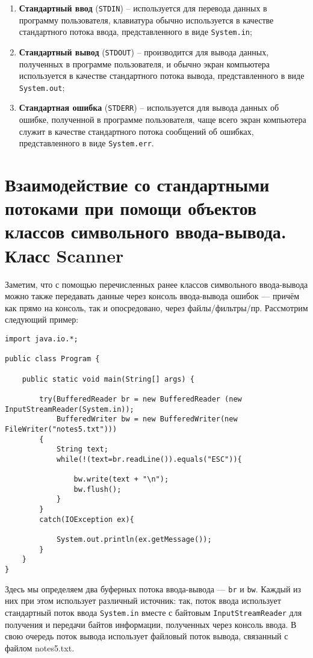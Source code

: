\begin{enumerate}
    \item \textbf{Стандартный ввод} (\verb|STDIN|) – используется для перевода данных в программу пользователя, клавиатура обычно используется в качестве стандартного потока ввода, представленного в виде \verb|System.in|;
    \item \textbf{Стандартный вывод} (\verb|STDOUT|) – производится для вывода данных, полученных в программе пользователя, и обычно экран компьютера используется в качестве стандартного потока вывода, представленного в виде \verb|System.out|;
    \item \textbf{Стандартная ошибка} (\verb|STDERR|) – используется для вывода данных об ошибке, полученной в программе пользователя, чаще всего экран компьютера служит в качестве стандартного потока сообщений об ошибках, представленного в виде \verb|System.err|.
\end{enumerate}

\section{Взаимодействие со стандартными потоками при помощи объектов классов символьного ввода-вывода. Класс Scanner}

Заметим, что с помощью перечисленных ранее классов символьного ввода-вывода можно также передавать данные через консоль ввода-вывода ошибок — причём как прямо на консоль, так и опосредовано, через файлы/фильтры/пр. Рассмотрим следующий пример:

\begin{lstlisting}
import java.io.*;
 
public class Program {
 
    public static void main(String[] args) {
         
        try(BufferedReader br = new BufferedReader (new InputStreamReader(System.in)); 
            BufferedWriter bw = new BufferedWriter(new FileWriter("notes5.txt")))
        {
            String text;
            while(!(text=br.readLine()).equals("ESC")){
                  
                bw.write(text + "\n");
                bw.flush();
            }
        }
        catch(IOException ex){
              
            System.out.println(ex.getMessage());
        } 
    }   
}
\end{lstlisting}

Здесь мы определяем два буферных потока ввода-вывода — \verb|br| и \verb|bw|. Каждый из них при этом использует различный источник: так, поток ввода использует стандартный поток ввода \verb|System.in| вместе с байтовым \verb|InputStreamReader| для получения и передачи байтов информации, полученных через консоль ввода. В свою очередь поток вывода использует файловый поток вывода, связанный с файлом notes5.txt.

